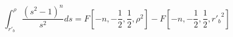 \begin{equation}
\int ^{\rho}_{r'_{b}}\frac{(s^{2}-1)^{n}}{s^{2}}ds =F[-n,-\frac{1}{2},\frac{1}{2},\rho^{2}]-F[-n,-\frac{1}{2},\frac{1}{2},{r'_{b}}^{2}]
\end{equation}

